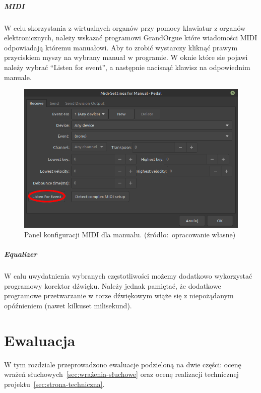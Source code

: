 \documentclass[11pt]{report}
\begin{document}
    \paragraph{MIDI}
    W celu skorzystania z wirtualnych organów przy pomocy klawiatur z organów elektronicznych,
    należy wskazać programowi GrandOrgue które wiadomości MIDI odpowiadają któremu manuałowi.
    Aby to zrobić wystarczy kliknąć prawym przyciskiem myszy na wybrany manuał w programie.
    W oknie które sie pojawi należy wybrać ``Listen for event'', a następnie nacisnąć klawisz na odpowiednim manuale.
    \begin{figure}[!htp]
        \centering
        \includegraphics[width=\linewidth]{fig/midiR.png}
        \caption{Panel konfiguracji MIDI dla manuału. (źródło:~opracowanie własne)}
        \label{fig:midi}
    \end{figure}

    \paragraph{Equalizer}
    W calu uwydatnienia wybranych częstotliwości możemy dodatkowo wykorzystać programowy korektor dźwięku.
    Należy jednak pamiętać, że dodatkowe programowe przetwarzanie w torze dźwiękowym wiąże się z niepożądanym opóźnieniem (nawet kilkuset milisekund).


    \chapter{Ewaluacja}
    W tym rozdziale przeprowadzono ewaluacje podzieloną na dwie części: ocenę wrażeń słuchowych~\ref{sec:wrażenia-słuchowe} oraz ocenę realizacji technicznej projektu~\ref{sec:strona-techniczna}.
\end{document}
